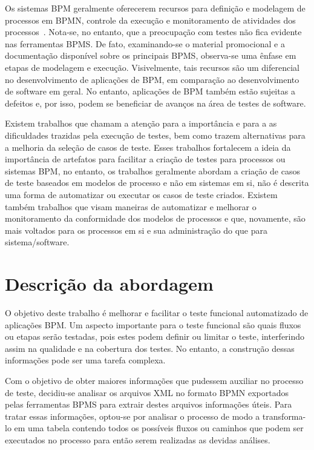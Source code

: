 \documentclass[12pt]{article}
\begin{document}
Os sistemas BPM geralmente oferecerem recursos para definição e modelagem de processos em BPMN, controle da execução e monitoramento de atividades dos processos~\cite{forrester}. Nota-se, no entanto, que a preocupação com testes não fica evidente nas ferramentas BPMS. De fato, examinando-se o material promocional e a documentação disponível sobre os principais BPMS, observa-se uma ênfase em etapas de modelagem e execução. Visivelmente, tais recursos são um diferencial no desenvolvimento de aplicações de BPM, em comparação ao desenvolvimento de software em geral. No entanto, aplicações de BPM também estão sujeitas a defeitos e, por isso, podem se beneficiar de avanços na área de testes de software.

Existem trabalhos que chamam a atenção para a importância e para a as dificuldades trazidas pela execução de testes, bem como trazem alternativas para a melhoria da seleção de casos de teste\cite{bohmer2015genetic}. Esses trabalhos fortalecem a ideia da importância de artefatos para facilitar a criação de testes para processos ou sistemas BPM, no entanto, os trabalhos geralmente abordam a criação de casos de teste baseados em modelos de processo e não em sistemas em si, não é descrita uma forma de automatizar ou executar os casos de teste criados. Existem também trabalhos que visam maneiras de automatizar e melhorar o monitoramento da conformidade dos modelos de processos \cite{ly2015compliance,van2012replaying} e que, novamente, são mais voltados para os processos em si e sua administração do que para sistema/software.

\section{Descrição da abordagem}
O objetivo deste trabalho é melhorar e facilitar o teste funcional automatizado de aplicações BPM. Um aspecto importante para o teste funcional são quais fluxos ou etapas serão testadas, pois estes podem definir ou limitar o teste, interferindo assim na qualidade e na cobertura dos testes. No entanto, a construção dessas informações pode ser uma tarefa complexa.

Com o objetivo de obter maiores informações que pudessem auxiliar no processo de teste, decidiu-se analisar os arquivos XML no formato BPMN exportados pelas ferramentas BPMS para extrair destes arquivos informações úteis. Para tratar essas informações, optou-se por analisar o processo de modo a transforma-lo em uma tabela contendo todos os possíveis fluxos ou caminhos que podem ser executados no processo para então serem realizadas as devidas análises. 
\end{document}
